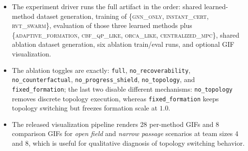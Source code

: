 \documentclass[journal]{IEEEtran}
\begin{document}
\begin{itemize}
    main paper tables, including topology switches, formation recovery
    time, and recoverability false-positive / false-negative rates;
     record
    the current single-seed dumps.
    \item The experiment driver runs the full artifact in the order:
    shared learned-method dataset generation, training of
    \{\textsc{gnn\_only}, \textsc{instant\_cert}, \textsc{rvt\_swarm}\},
    evaluation of those three learned methods plus
    \{\textsc{adaptive\_formation}, \textsc{cbf\_qp\_like},
    \textsc{orca\_like}, \textsc{centralized\_mpc}\}, shared ablation
    dataset generation, six ablation train/eval runs, and optional GIF
    visualization.
    \item The ablation toggles are exactly:
    \texttt{full},
    \texttt{no\_recoverability},
    \texttt{no\_counterfactual},
    \texttt{no\_progress\_shield},
    \texttt{no\_topology}, and
    \texttt{fixed\_formation}; the last two disable different mechanisms:
    \texttt{no\_topology} removes discrete topology execution, whereas
    \texttt{fixed\_formation} keeps topology switching but freezes
    formation scale at $1.0$.
    \item The released visualization pipeline renders 28 per-method GIFs
    and 8 comparison GIFs for \emph{open field} and \emph{narrow
    passage} scenarios at team sizes 4 and 8, which is useful for
    qualitative diagnosis of topology switching behavior.
\end{itemize}
\endgroup
\end{document}
